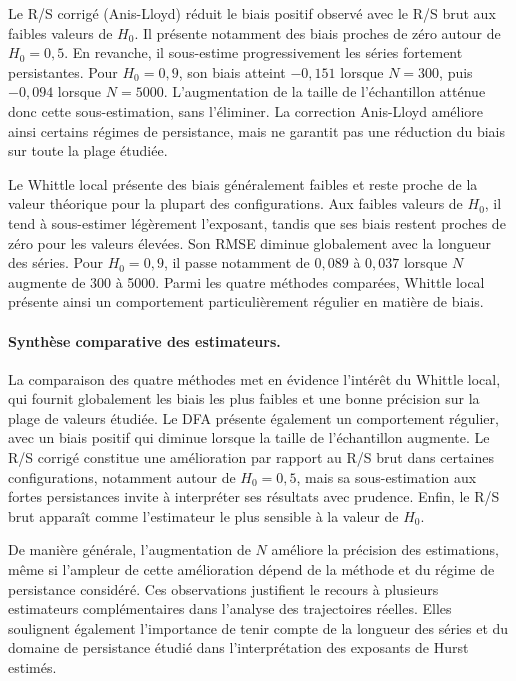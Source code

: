 Le R/S corrigé (Anis-Lloyd) réduit le biais positif observé avec
le R/S brut aux faibles valeurs de $H_0$. Il présente notamment
des biais proches de zéro autour de $H_0=0{,}5$. En revanche,
il sous-estime progressivement les séries fortement persistantes.
Pour $H_0=0{,}9$, son biais atteint $-0{,}151$ lorsque $N=300$,
puis $-0{,}094$ lorsque $N=5000$. L'augmentation de la taille
de l'échantillon atténue donc cette sous-estimation, sans
l'éliminer. La correction Anis-Lloyd améliore ainsi certains
régimes de persistance, mais ne garantit pas une réduction du
biais sur toute la plage étudiée.

Le Whittle local présente des biais généralement faibles et
reste proche de la valeur théorique pour la plupart des
configurations. Aux faibles valeurs de $H_0$, il tend à
sous-estimer légèrement l'exposant, tandis que ses biais restent
proches de zéro pour les valeurs élevées. Son RMSE diminue
globalement avec la longueur des séries. Pour $H_0=0{,}9$,
il passe notamment de $0{,}089$ à $0{,}037$ lorsque $N$
augmente de 300 à 5000. Parmi les quatre méthodes comparées,
Whittle local présente ainsi un comportement particulièrement
régulier en matière de biais.

\paragraph{Synthèse comparative des estimateurs.}

La comparaison des quatre méthodes met en évidence l'intérêt
du Whittle local, qui fournit globalement les biais les plus
faibles et une bonne précision sur la plage de valeurs étudiée.
Le DFA présente également un comportement régulier, avec un
biais positif qui diminue lorsque la taille de l'échantillon
augmente. Le R/S corrigé constitue une amélioration par rapport
au R/S brut dans certaines configurations, notamment autour
de $H_0=0{,}5$, mais sa sous-estimation aux fortes persistances
invite à interpréter ses résultats avec prudence. Enfin, le
R/S brut apparaît comme l'estimateur le plus sensible à la
valeur de $H_0$.

De manière générale, l'augmentation de $N$ améliore la précision
des estimations, même si l'ampleur de cette amélioration dépend
de la méthode et du régime de persistance considéré. Ces
observations justifient le recours à plusieurs estimateurs
complémentaires dans l'analyse des trajectoires réelles. Elles
soulignent également l'importance de tenir compte de la longueur
des séries et du domaine de persistance étudié dans
l'interprétation des exposants de Hurst estimés.

